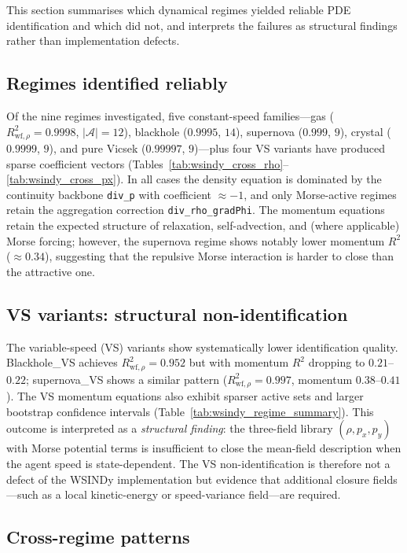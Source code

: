 This section summarises which dynamical regimes yielded reliable PDE identification
and which did not, and interprets the failures as structural findings rather
than implementation defects.

\subsection{Regimes identified reliably}
\label{subsec:outcomes_reliable}

Of the nine regimes investigated, five constant-speed
families---gas ($R^2_{\text{wf},\rho}=0.9998$, $|\mathcal{A}|=12$),
blackhole ($0.9995$, $14$),
supernova ($0.999$, $9$),
crystal ($0.9999$, $9$),
and pure Vicsek ($0.99997$, $9$)---plus four VS
variants have produced sparse coefficient
vectors (Tables~\ref{tab:wsindy_cross_rho}--\ref{tab:wsindy_cross_px}).
In all cases the density equation is dominated by the continuity backbone
\texttt{div\_p} with coefficient $\approx -1$, and only
Morse-active regimes retain the aggregation correction
\texttt{div\_rho\_gradPhi}.  The momentum equations retain the expected
structure of relaxation, self-advection, and
(where applicable) Morse forcing; however, the supernova regime shows
notably lower momentum $R^2$ ($\approx 0.34$), suggesting that the
repulsive Morse interaction is harder to close than the attractive one.

\subsection{VS variants: structural non-identification}
\label{subsec:outcomes_vs}

The variable-speed (VS) variants show systematically lower identification
quality.  Blackhole\_VS achieves $R^2_{\text{wf},\rho}=0.952$ but with
momentum $R^2$ dropping to $0.21$--$0.22$; supernova\_VS shows a similar
pattern ($R^2_{\text{wf},\rho}=0.997$, momentum $0.38$--$0.41$).
The VS momentum equations also exhibit sparser active sets and larger
bootstrap confidence intervals
(Table~\ref{tab:wsindy_regime_summary}).
This outcome is interpreted as a \emph{structural finding}: the three-field
library $(\rho, p_x, p_y)$ with Morse potential terms is insufficient to
close the mean-field description when the agent speed is state-dependent.
The VS non-identification is therefore not a defect of the WSINDy
implementation but evidence that additional closure fields---such as a
local kinetic-energy or speed-variance field---are required.

\subsection{Cross-regime patterns}
\label{subsec:outcomes_patterns}

